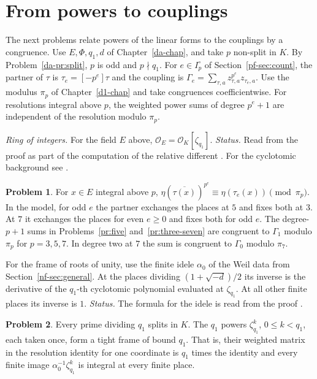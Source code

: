 \documentclass[reqno]{amsart}
\newcounter{chap}
\theoremstyle{plain}
\theoremstyle{definition}
\newtheorem{problem}{Problem}[section]
\theoremstyle{remark}
\newcommand{\Oc}{\mathcal O}
\begin{document}
\section{From powers to couplings}\label{sec:couplings}

The next problems relate powers of the linear forms to the couplings by a congruence.  Use \(E,\Phi,q_1,d\) of Chapter~\ref{da-chap}, and take \(p\) non-split in \(K\).  By Problem~\ref{da-pr:split}, \(p\) is odd and \(p\nmid q_1\).  For \(e\in I_p^\circ\) of Section~\ref{pf-sec:count}, the partner of \(\tau\) is \(\tau_e=[-p^e]\tau\) and the coupling is \(\Gamma_e=\sum_{\tau,a}z_{\tau,a}^{p^e} z_{\tau_e,a}\).  Use the modulus \(\pi_p\) of Chapter~\ref{d1-chap} and take congruences coefficientwise.  For resolutions integral above \(p\), the weighted power sums of degree \(p^e+1\) are independent of the resolution modulo \(\pi_p\).

\emph{Ring of integers.} For the field \(E\) above, \(\Oc_E=\Oc_K[\zeta_{q_1}]\).  \emph{Status.} Read from the proof as part of the computation of the relative different \cite{GL}.  For the cyclotomic background see \cite{Wa}.

\begin{problem}\label{pr:frobenius}
For \(x\in E\) integral above \(p\), \(\eta(\overline{\tau(x)})^{p^e}\equiv\eta(\tau_e(x))\pmod{\pi_p}\).
In the model, for odd \(e\) the partner exchanges the places at \(5\) and fixes both at \(3\).  At \(7\) it exchanges the places for even \(e\ge0\) and fixes both for odd \(e\).  The degree-\(p+1\) sums in Problems~\ref{pr:five} and~\ref{pr:three-seven} are congruent to \(\Gamma_1\) modulo \(\pi_p\) for \(p=3,5,7\).  In degree two at \(7\) the sum is congruent to \(\Gamma_0\) modulo \(\pi_7\).
\end{problem}

For the frame of roots of unity, use the finite idele \(\alpha_0\) of the Weil data from Section~\ref{nf-sec:general}.  At the places dividing \((1+\sqrt{-d})/2\) its inverse is the derivative of the \(q_1\)-th cyclotomic polynomial evaluated at \(\zeta_{q_1}\).  At all other finite places its inverse is \(1\).  \emph{Status.} The formula for the idele is read from the proof \cite{GL}.

\begin{problem}\label{pr:roots}
Every prime dividing \(q_1\) splits in \(K\).  The \(q_1\) powers \(\zeta_{q_1}^k\), \(0\le k<q_1\), each taken once, form a tight frame of bound \(q_1\).  That is, their weighted matrix in the resolution identity for one coordinate is \(q_1\) times the identity and every finite image \(\alpha_0^{-1}\zeta_{q_1}^k\) is integral at every finite place.
\end{problem}
\end{document}
